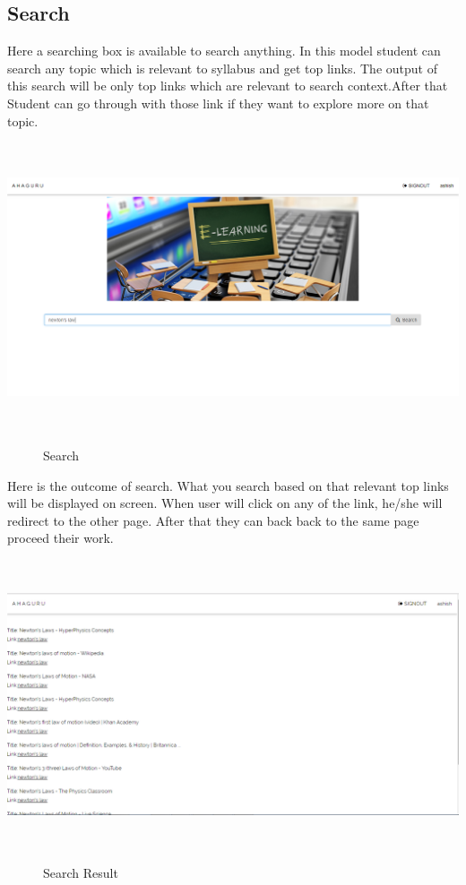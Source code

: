\subsection{Search}
Here a searching box is available to search anything. In this model student can search any topic which is relevant to syllabus and get top links. The output of this search will be only top links which are relevant to search context.After that Student can go through with those link if they want to explore more on that topic. 
\begin{center}
	\includegraphics[width=13.5cm, height=8.5cm]{search.png}
	\begin{figure}[h!]
		\centering
		\caption{Search}%
	\end{figure}
\end{center}\break

Here is the outcome of search. What you search based on that relevant top links will be displayed on screen. When user will click on any of the link, he/she will redirect to the other page. After that they can back back to the same page proceed their work.
\begin{center}
	\includegraphics[width=13.5cm, height=8.5cm]{search1.png}
	\begin{figure}[h!]
		\centering
		\caption{Search Result}%
	\end{figure}
\end{center}\break
